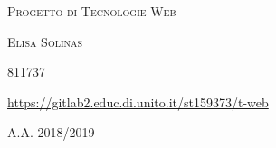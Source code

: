 \pagestyle{empty}


\null{}
\centerline {\Large\textsc{Progetto di Tecnologie Web}}

\vskip 3cm

\centerline {\Large{\textsc{Elisa Solinas}}}
\vskip 1cm
\centerline {\Large{\textsc{811737}}}
\vskip 2cm
\centerline
{\Large \url{https://gitlab2.educ.di.unito.it/st159373/t-web}}
\vskip 3cm

\centerline {\Large\textsc{A.A. 2018/2019}}
\null

